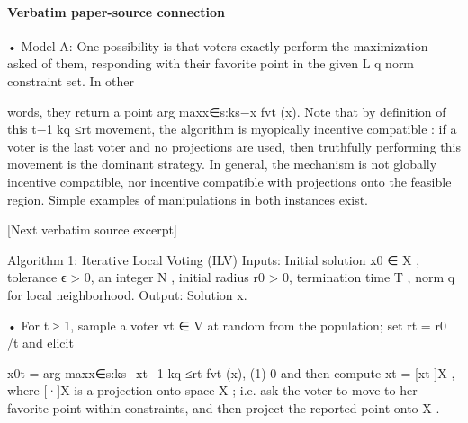 \documentclass[10pt]{article}
\begin{document}
\paragraph{Verbatim paper-source connection}
\begin{ReviewVerbatim}
• Model A:       One possibility is that voters exactly perform the maximization asked of
  them, responding with their favorite point in the given L
                                                                       q norm constraint set. In other

  words, they return a point arg maxx∈{s:ks−x                    fvt (x). Note that by definition of this
                                                  t−1 kq ≤rt }
  movement, the algorithm is     myopically incentive compatible : if a voter is the last voter
  and no projections are used, then truthfully performing this movement is the dominant
  strategy.   In general, the mechanism is not globally incentive compatible, nor incentive
  compatible with projections onto the feasible region. Simple examples of manipulations
  in both instances exist.

[Next verbatim source excerpt]

 Algorithm 1: Iterative Local Voting (ILV)
  Inputs: Initial solution x0 ∈ X , tolerance ϵ > 0, an integer N , initial radius r0 > 0,
    termination time T , norm q for local neighborhood.
   Output:     Solution x.

       • For t ≥ 1, sample a voter vt ∈ V at random from the population; set rt = r0 /t
           and elicit


                             x0t = arg maxx∈{s:ks−xt−1 kq ≤rt } fvt (x),             (1)
                                         0
           and then compute xt = [xt ]X , where [·]X is a projection onto space X ; i.e. ask
           the voter to move to her favorite point within constraints, and then project the
           reported point onto X .
\end{ReviewVerbatim}
\end{document}
